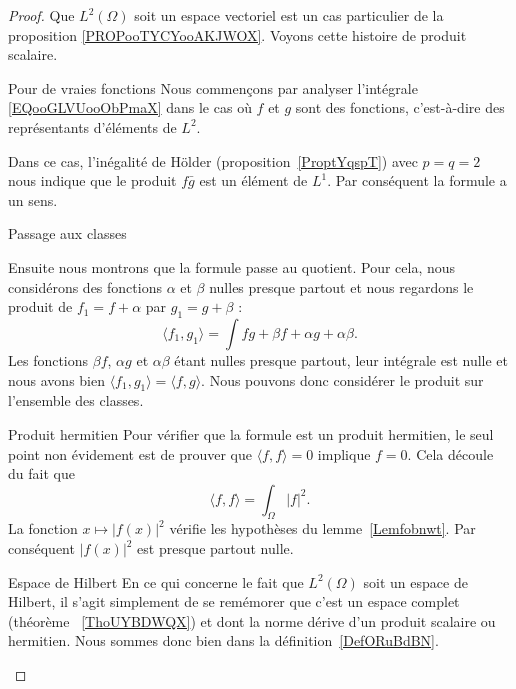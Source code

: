 \begin{proof}
    Que \( L^2(\Omega)\) soit un espace vectoriel est un cas particulier de la proposition \ref{PROPooTYCYooAKJWOX}. Voyons cette histoire de produit scalaire.

    \begin{subproof}
        \item[Pour de vraies fonctions]
            Nous commençons par analyser l'intégrale \eqref{EQooGLVUooObPmaX} dans le cas où \( f\) et \( g\) sont des fonctions, c'est-à-dire des représentants d'éléments de \( L^2\).

            Dans ce cas, l'inégalité de Hölder (proposition~\ref{ProptYqspT}) avec \( p=q=2\) nous indique que le produit \( f\bar g\) est un élément de \( L^1\). Par conséquent la formule a un sens.

        \item[Passage aux classes]

            Ensuite nous montrons que la formule passe au quotient. Pour cela, nous considérons des fonctions \( \alpha\) et \( \beta\) nulles presque partout et nous regardons le produit de \( f_1=f+\alpha\) par \( g_1=g+\beta\) :
            \begin{equation}
                \langle f_1, g_1\rangle =\int fg+\beta f+\alpha g+ \alpha\beta.
            \end{equation}
            Les fonctions \( \beta f\), \( \alpha g\) et \( \alpha\beta\) étant nulles presque partout, leur intégrale est nulle et nous avons bien \( \langle f_1, g_1\rangle =\langle f,g \rangle \). Nous pouvons donc considérer le produit sur l'ensemble des classes.

        \item[Produit hermitien]
            Pour vérifier que la formule est un produit hermitien, le seul point non évidement est de prouver que \( \langle f, f\rangle =0\) implique \( f=0\). Cela découle du fait que
            \begin{equation}
                \langle f, f\rangle =\int_{\Omega}| f |^2.
            \end{equation}
            La fonction \( x\mapsto | f(x) |^2\) vérifie les hypothèses du lemme~\ref{Lemfobnwt}. Par conséquent \( | f(x) |^2\) est presque partout nulle.

        \item[Espace de Hilbert]
            En ce qui concerne le fait que \( L^2(\Omega)\) soit un espace de Hilbert, il s'agit simplement de se remémorer que c'est un espace complet (théorème ~\ref{ThoUYBDWQX}) et dont la norme dérive d'un produit scalaire ou hermitien. Nous sommes donc bien dans la définition~\ref{DefORuBdBN}.
    \end{subproof}
\end{proof}

